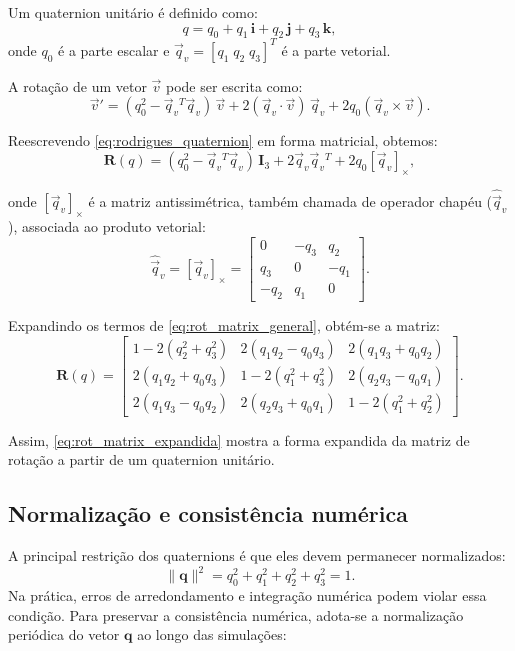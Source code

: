 Um quaternion unitário é definido como:
\begin{equation}
q = q_0 + q_1 \, \mathbf{i} + q_2 \, \mathbf{j} + q_3 \, \mathbf{k},
\label{eq:def_quaternion}
\end{equation}
onde $q_0$ é a parte escalar e $\vec{q}_v = [q_1 \; q_2 \; q_3]^T$ é a parte vetorial.  

A rotação de um vetor $\vec{v}$ pode ser escrita como:
\begin{equation}
\vec{v}' = (q_0^2 -
\vec q_v{^T} \vec{q}_v)\,\vec{v} 
+ 2(\vec{q}_v \cdot \vec{v})\,\vec{q}_v
+ 2q_0 (\vec{q}_v \times \vec{v}).
\label{eq:rodrigues_quaternion}
\end{equation}

Reescrevendo \eqref{eq:rodrigues_quaternion} em forma matricial, obtemos:
\begin{equation}
\mathbf{R}(q) = (q_0^2 - \vec{q}_v{^T} \vec{q}_v)\,\mathbf{I}_3 
+ 2 \vec{q}_v \vec{q}_v{^T}
+ 2q_0 [\vec{q}_v]_\times,
\label{eq:rot_matrix_general}
\end{equation}

onde $[\vec{q}_v]_\times$ é a matriz antissimétrica, também chamada de operador chapéu ($\hat{\vec{q}}_v$), associada ao produto vetorial:
\begin{equation}
\hat{\vec{q}}_v = [\vec{q}_v]_\times =
\begin{bmatrix}
0 & -q_3 & q_2 \\
q_3 & 0 & -q_1 \\
-q_2 & q_1 & 0
\end{bmatrix}.
\label{eq:skew_matrix}
\end{equation}

Expandindo os termos de \eqref{eq:rot_matrix_general}, obtém-se a matriz:
\begin{equation}
\mathbf{R}(q) =
\begin{bmatrix}
1 - 2(q_2^2+q_3^2) & 2(q_1q_2 - q_0q_3) & 2(q_1q_3+q_0q_2) \\
2(q_1q_2+q_0q_3)   & 1 - 2(q_1^2+q_3^2) & 2(q_2q_3 - q_0q_1) \\
2(q_1q_3 - q_0q_2) & 2(q_2q_3+q_0q_1)   & 1 - 2(q_1^2+q_2^2)
\end{bmatrix}.
\label{eq:rot_matrix_expandida}
\end{equation}

Assim, \eqref{eq:rot_matrix_expandida} mostra a forma expandida da matriz de rotação a partir de um quaternion unitário.

\subsection{Normalização e consistência numérica}
A principal restrição dos quaternions é que eles devem permanecer normalizados:
\begin{equation}
\label{eq:normalizacao_quaternion}
\lVert \mathbf{q} \rVert^2 = q_0^2 + q_1^2 + q_2^2 + q_3^2 = 1.
\end{equation}
Na prática, erros de arredondamento e integração numérica podem violar essa condição. Para preservar a consistência numérica, adota-se a normalização periódica do vetor $\mathbf{q}$ ao longo das simulações:

